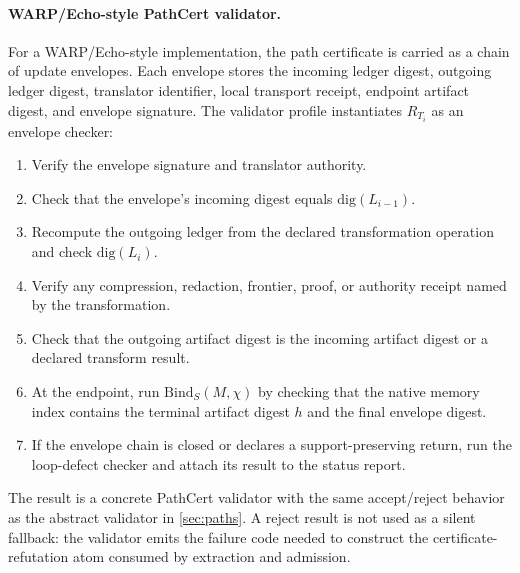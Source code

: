 \documentclass[11pt,twoside]{article}
\theoremstyle{definition}
\newcommand{\Bind}{\mathrm{Bind}}
\begin{document}
\paragraph{WARP/Echo-style PathCert validator.}
For a WARP/Echo-style implementation, the path certificate is carried as a chain
of update envelopes. Each envelope stores the incoming ledger digest, outgoing
ledger digest, translator identifier, local transport receipt, endpoint artifact
digest, and envelope signature. The validator profile instantiates
$R_{T_i}$ as an envelope checker:
\begin{enumerate}[leftmargin=*]
  \item Verify the envelope signature and translator authority.
  \item Check that the envelope's incoming digest equals $\mathrm{dig}(L_{i-1})$.
  \item Recompute the outgoing ledger from the declared transformation
        operation and check $\mathrm{dig}(L_i)$.
  \item Verify any compression, redaction, frontier, proof, or authority receipt
        named by the transformation.
  \item Check that the outgoing artifact digest is the incoming artifact digest
        or a declared transform result.
  \item At the endpoint, run $\Bind_S(M,\chi)$ by checking that the native
        memory index contains the terminal artifact digest $h$ and the final
        envelope digest.
  \item If the envelope chain is closed or declares a support-preserving return,
        run the loop-defect checker and attach its result to the status report.
\end{enumerate}
The result is a concrete PathCert validator with the same accept/reject behavior
as the abstract validator in \cref{sec:paths}. A reject result is not used as a
silent fallback: the validator emits the failure code needed to construct the
certificate-refutation atom consumed by extraction and admission.

\nocite{ross_og_i_2026,ross_og_ii_2026}
\printbibliography
\end{document}
